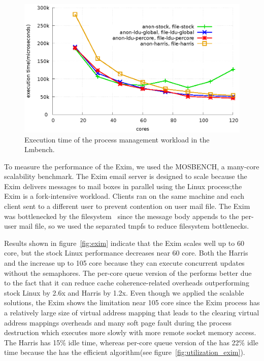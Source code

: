 \begin{figure}[tb]
  \begin{center}
    \includegraphics[scale=0.8]{graph/lmbench.eps}
  \end{center}
  \caption{Execution time of the process management workload in the Lmbench.}
  \label{fig:MicroBench}
\end{figure}

To measure the performance of the Exim, we used the MOSBENCH, a many-core
scalability benchmark.
The Exim email server is designed to scale because the Exim delivers messages to
mail boxes in parallel using the Linux process;the Exim is a fork-intensive
workload.
Clients ran on the same machine and each client sent to a different user to
prevent contention on user mail file.
The Exim was bottlenecked by the filesystem~\cite{SilasBoydWickizer2010LinuxScales48} since the message body appends to
the per-user mail file, so we used the separated tmpfs to reduce filesystem
bottlenecks.

Results shown in figure~\ref{fig:exim} indicate that the Exim scales well up to
60 core, but the stock Linux performance decreases near 60 core.
Both the Harris and the \LDU increase up to 105 core because they can execute
concurrent updates without the semaphores.
The per-core queue version of the \LDU performs better due to the fact that it can reduce
cache coherence-related overheads outperforming stock Linux by 2.6x and Harris
by 1.2x.
Even though we applied the scalable solutions, the Exim shows the limitation
near 105 core since the Exim process has a relatively large size of virtual
address mapping that leads to the clearing virtual address mappings overheads
and many soft page fault during the process destruction which executes more
slowly with more remote socket memory access.
The Harris has 15\% idle time, whereas per-core queue version of the \LDU
has 22\% idle time because the \LDU has the efficient algorithm(see
figure~\ref{fig:utilization_exim}).

